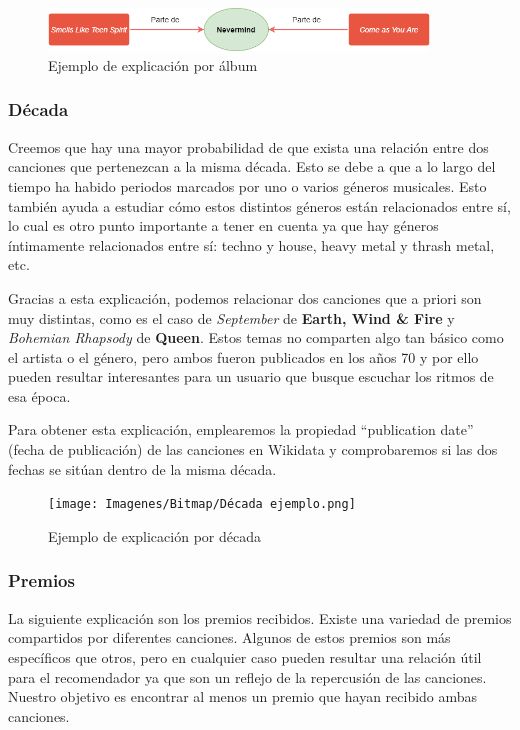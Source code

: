 \begin{figure}[h!]
	\centering
	\includegraphics[width = 0.9\textwidth]{Imagenes/Bitmap/Álbum ejemplo.png}
	\caption{Ejemplo de explicación por álbum}
	\label{fig:sampleImage}
\end{figure}

\subsubsection*{Década}

Creemos que hay una mayor probabilidad de que exista una relación entre dos canciones que pertenezcan a la misma década. Esto se debe a que a lo largo del tiempo ha habido periodos marcados por uno o varios géneros musicales. Esto también ayuda a estudiar cómo estos distintos géneros están relacionados entre sí, lo cual es otro punto importante a tener en cuenta ya que hay géneros íntimamente relacionados entre sí: techno y house, heavy metal y thrash metal, etc.

Gracias a esta explicación, podemos relacionar dos canciones que a priori son muy distintas, como es el caso de \textit{September} de \textbf{Earth, Wind \& Fire} y \textit{Bohemian Rhapsody} de \textbf{Queen}. Estos temas no comparten algo tan básico como el artista o el género, pero ambos fueron publicados en los años 70 y por ello pueden resultar interesantes para un usuario que busque escuchar los ritmos de esa época.

Para obtener esta explicación, emplearemos la propiedad ``publication date'' (fecha de publicación) de las canciones en Wikidata y comprobaremos si las dos fechas se sitúan dentro de la misma década.\\

\begin{figure}[h!]
	\centering
	\texttt{[image: Imagenes/Bitmap/Década ejemplo.png]}
	\caption{Ejemplo de explicación por década}
	\label{fig:sampleImage}
\end{figure}

\subsubsection*{Premios}

La siguiente explicación son los premios recibidos. Existe una variedad de premios compartidos por diferentes canciones. Algunos de estos premios son más específicos que otros, pero en cualquier caso pueden resultar una relación útil para el recomendador ya que son un reflejo de la repercusión de las canciones. Nuestro objetivo es encontrar al menos un premio que hayan recibido ambas canciones.

